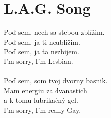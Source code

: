 \section{L.A.G. Song}
\begin{multicols}{2}
Poď sem, nech sa stebou zblížim.\\
Poď sem, ja ti neubližim.\\
Poď sem, ja ťa nezbijem.\\
I'm sorry, I'm Lesbian.\\
\\
Poď sem, som tvoj dvorny basnik.\\
Mam energiu za dvanastich\\
a k tomu lubrikačný gel.\\
I'm sorry, I'm really Gay.\\


\end{multicols}
